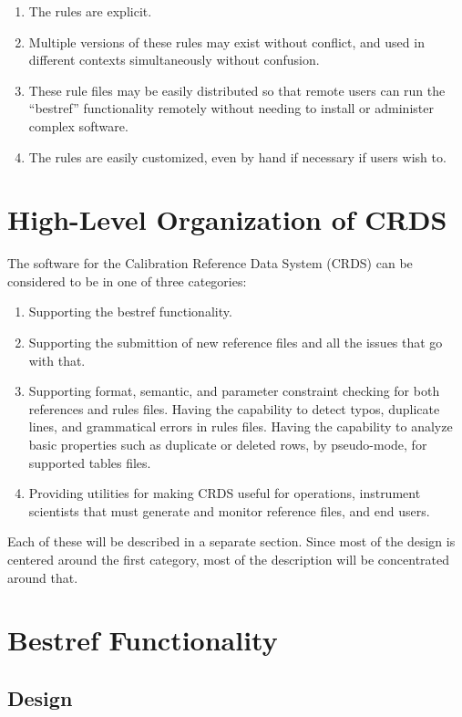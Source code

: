 \documentclass[final,authoryear,5p,times,twocolumn]{elsarticle}
\begin{document}
\begin{enumerate}
\item The rules are explicit.
\item Multiple versions of these rules may exist without conflict, and used in
different contexts simultaneously without confusion.
\item These rule files may be easily distributed so that remote users can run the
``bestref'' functionality remotely without needing to install or administer
complex software.
\item The rules are easily customized, even by hand if necessary if
users wish to.
\end{enumerate}

\section{High-Level Organization of CRDS}

The software for the Calibration Reference Data System (CRDS) 
can be considered to be in one of three categories:

\begin{enumerate}
\item Supporting the bestref functionality.
\item Supporting the submittion of new reference files and all the issues that
go with that.
\item Supporting format, semantic, and parameter constraint checking for both
references and rules files.  Having the capability to detect typos, duplicate 
lines, and grammatical errors in rules files. 
Having the capability to analyze basic properties
such as duplicate or deleted rows,  by pseudo-mode, for supported tables files.
\item Providing utilities for making CRDS useful for operations, instrument
scientists that must generate and monitor reference files, and end users.
\end{enumerate}

Each of these will be described in a separate section. Since most of the design
is centered around the first category, most of the description will be concentrated
around that.

\section{Bestref Functionality}

\subsection{Design}
\end{document}
